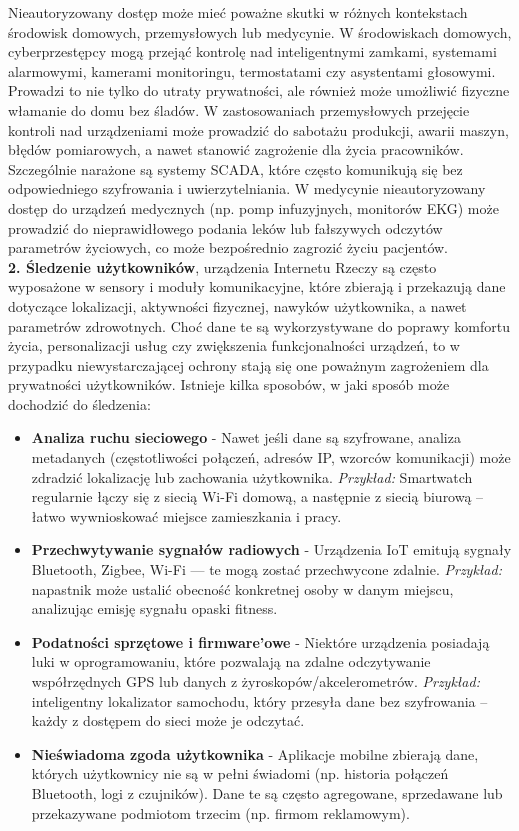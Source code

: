 Nieautoryzowany dostęp może mieć poważne skutki w różnych kontekstach środowisk domowych, przemysłowych lub medycynie. W środowiskach domowych, cyberprzestępcy mogą przejąć kontrolę nad inteligentnymi zamkami, systemami alarmowymi, kamerami monitoringu, termostatami czy asystentami głosowymi. Prowadzi to nie tylko do utraty prywatności, ale również może umożliwić fizyczne włamanie do domu bez śladów. W zastosowaniach przemysłowych przejęcie kontroli nad urządzeniami może prowadzić do sabotażu produkcji, awarii maszyn, błędów pomiarowych, a nawet stanowić zagrożenie dla życia pracowników. Szczególnie narażone są systemy SCADA, które często komunikują się bez odpowiedniego szyfrowania i uwierzytelniania. W medycynie nieautoryzowany dostęp do urządzeń medycznych (np. pomp infuzyjnych, monitorów EKG) może prowadzić do nieprawidłowego podania leków lub fałszywych odczytów parametrów życiowych, co może bezpośrednio zagrozić życiu pacjentów. \cite{antonakakis2017mirai}
\vspace{10pt} \\
\textbf{2. Śledzenie użytkowników}, urządzenia Internetu Rzeczy są często wyposażone w sensory i moduły komunikacyjne, które zbierają i przekazują dane dotyczące lokalizacji, aktywności fizycznej, nawyków użytkownika, a nawet parametrów zdrowotnych. Choć dane te są wykorzystywane do poprawy komfortu życia, personalizacji usług czy zwiększenia funkcjonalności urządzeń, to w przypadku niewystarczającej ochrony stają się one poważnym zagrożeniem dla prywatności użytkowników. Istnieje kilka sposobów, w jaki sposób może dochodzić do śledzenia:
\begin{itemize}
    \item \textbf{Analiza ruchu sieciowego} - Nawet jeśli dane są szyfrowane, analiza metadanych (częstotliwości połączeń, adresów IP, wzorców komunikacji) może zdradzić lokalizację lub zachowania użytkownika. \textit{Przykład: } Smartwatch regularnie łączy się z siecią Wi-Fi domową, a następnie z siecią biurową – łatwo wywnioskować miejsce zamieszkania i pracy.
    \item \textbf{Przechwytywanie sygnałów radiowych} -  Urządzenia IoT emitują sygnały Bluetooth, Zigbee, Wi-Fi — te mogą zostać przechwycone zdalnie. \textit{Przykład: } napastnik może ustalić obecność konkretnej osoby w danym miejscu, analizując emisję sygnału opaski fitness.
    \item \textbf{Podatności sprzętowe i firmware'owe} - Niektóre urządzenia posiadają luki w oprogramowaniu, które pozwalają na zdalne odczytywanie współrzędnych GPS lub danych z żyroskopów/akcelerometrów. \textit{Przykład: } inteligentny lokalizator samochodu, który przesyła dane bez szyfrowania – każdy z dostępem do sieci może je odczytać.
    \item \textbf{Nieświadoma zgoda użytkownika} - Aplikacje mobilne zbierają dane, których użytkownicy nie są w pełni świadomi (np. historia połączeń Bluetooth, logi z czujników). Dane te są często agregowane, sprzedawane lub przekazywane podmiotom trzecim (np. firmom reklamowym).
\end{itemize}
